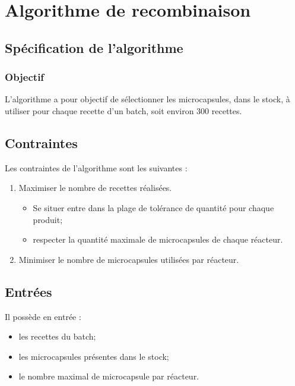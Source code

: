 \section{Algorithme de recombinaison}
\subsection{Spécification de l'algorithme}
\subsubsection*{Objectif}
L'algorithme a pour objectif de sélectionner les \glspl{microcapsule}, dans le stock, à utiliser pour chaque recette d'un batch, soit environ $300$ recettes.

\subsection*{Contraintes}
Les contraintes de l'algorithme sont les suivantes : 
\begin{enumerate}
    \item Maximiser le nombre de recettes réalisées.
    \begin{itemize}
        \item Se situer entre dans la plage de tolérance de quantité pour chaque produit; 
        \item respecter la quantité maximale de \glspl{microcapsule} de chaque réacteur.
    \end{itemize}    
    \item Minimiser le nombre de \glspl{microcapsule} utilisées par réacteur.
\end{enumerate}
\subsection*{Entrées}
Il possède en entrée : 
\begin{itemize}
    \item les recettes du batch;
    \item les \glspl{microcapsule} présentes dans le stock;
    \item le nombre maximal de \gls{microcapsule} par réacteur.
\end{itemize}

